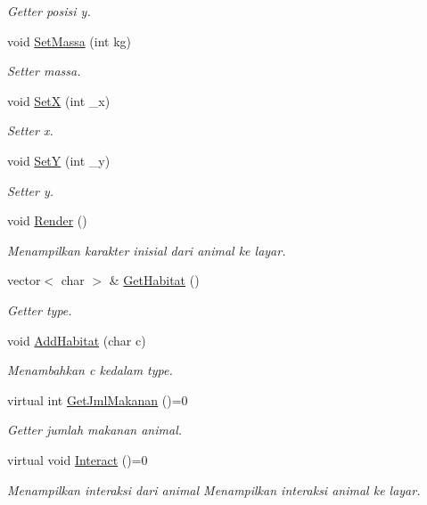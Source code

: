 \begin{DoxyCompactItemize}
\begin{DoxyCompactList}\small\item\em Getter posisi y. \end{DoxyCompactList}\item 
void \hyperlink{classAnimal_aa3fa9d72dbcb5acc7310366d8ff361d5}{Set\+Massa} (int kg)
\begin{DoxyCompactList}\small\item\em Setter massa. \end{DoxyCompactList}\item 
void \hyperlink{classAnimal_ae938862e1651b348b2ed5fcc5b64c625}{SetX} (int \+\_\+x)
\begin{DoxyCompactList}\small\item\em Setter x. \end{DoxyCompactList}\item 
void \hyperlink{classAnimal_af4892ee71e8bbc91f23797ee4dbe3100}{SetY} (int \+\_\+y)
\begin{DoxyCompactList}\small\item\em Setter y. \end{DoxyCompactList}\item 
void \hyperlink{classAnimal_a00c911d660d2a76c6fc696cf6fe26617}{Render} ()\hypertarget{classAnimal_a00c911d660d2a76c6fc696cf6fe26617}{}\label{classAnimal_a00c911d660d2a76c6fc696cf6fe26617}

\begin{DoxyCompactList}\small\item\em Menampilkan karakter inisial dari animal ke layar. \end{DoxyCompactList}\item 
vector$<$ char $>$ \& \hyperlink{classAnimal_a892a7fc299149570c841ee7215b4bb4b}{Get\+Habitat} ()
\begin{DoxyCompactList}\small\item\em Getter type. \end{DoxyCompactList}\item 
void \hyperlink{classAnimal_a8a40826811fda32a7a3dfeae6b8723fd}{Add\+Habitat} (char c)
\begin{DoxyCompactList}\small\item\em Menambahkan c kedalam type. \end{DoxyCompactList}\item 
virtual int \hyperlink{classAnimal_a3f1cced7bac93f7c88a24ec5a0e989fe}{Get\+Jml\+Makanan} ()=0
\begin{DoxyCompactList}\small\item\em Getter jumlah makanan animal. \end{DoxyCompactList}\item 
virtual void \hyperlink{classAnimal_aa620e55ec419fc9b20d983d933b5ee11}{Interact} ()=0\hypertarget{classAnimal_aa620e55ec419fc9b20d983d933b5ee11}{}\label{classAnimal_aa620e55ec419fc9b20d983d933b5ee11}

\begin{DoxyCompactList}\small\item\em Menampilkan interaksi dari animal Menampilkan interaksi animal ke layar. \end{DoxyCompactList}\end{DoxyCompactItemize}
